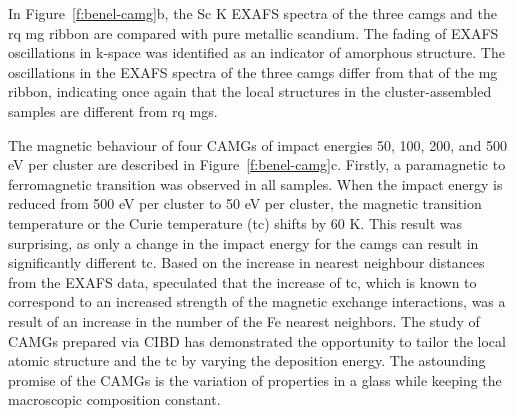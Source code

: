 In Figure~\ref{f:benel-camg}b, the Sc K EXAFS spectra of the three \gls{camg}s and the \gls{rq} \gls{mg} ribbon are compared with pure metallic scandium. The fading of EXAFS oscillations in k-space was identified as an indicator of amorphous structure. The oscillations in the EXAFS spectra of the three \gls{camg}s differ from that of the \gls{mg} ribbon, indicating once again that the local structures in the cluster-assembled samples are different from \gls{rq} \glspl{mg}. \par

The magnetic behaviour of four \fs CAMGs of impact energies 50, 100, 200, and 500 eV per cluster are described in Figure~\ref{f:benel-camg}c.  Firstly, a paramagnetic to ferromagnetic transition was observed in all samples. When the impact energy is reduced from 500 eV per cluster to 50 eV per cluster, the magnetic transition temperature or the Curie temperature (\gls{tc}) shifts by 60 K. This result was surprising, as only a change in the impact energy for the \glspl{camg} can result in significantly different \gls{tc}. Based on the increase in nearest neighbour distances from the EXAFS data, \textcite{Benel2019} speculated that the increase of \gls{tc}, which is known to correspond to an increased strength of the magnetic exchange interactions, was a result of an increase in the number of the Fe nearest neighbors. The study of \fs CAMGs prepared via CIBD has demonstrated the opportunity to tailor the local atomic structure and the \gls{tc} by varying the deposition energy. The astounding promise of the CAMGs is the variation of properties in a glass while keeping the macroscopic composition constant.



